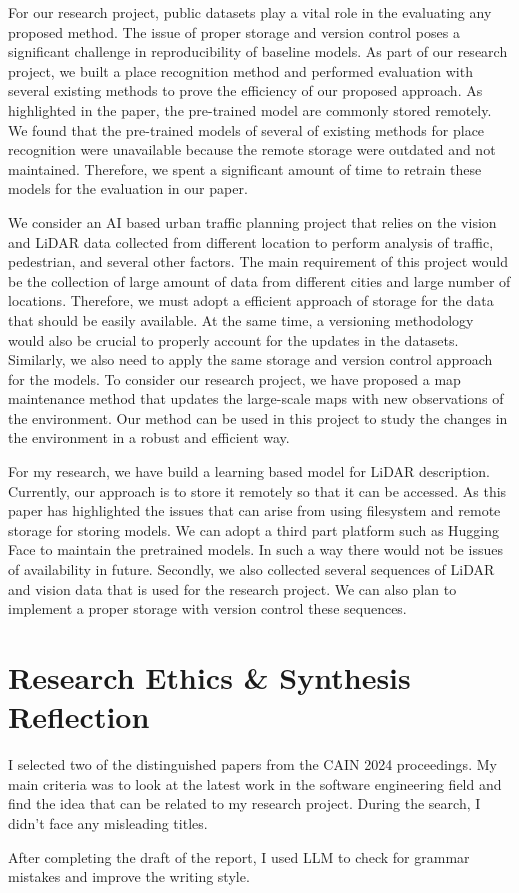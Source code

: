 \documentclass{article}
\begin{document}
For our research project, public datasets play a vital role in the evaluating any proposed method. The issue of proper storage and version control poses a significant challenge in reproducibility of baseline models. As part of our research project, we built a place recognition method and performed evaluation with several existing methods to prove the efficiency of our proposed approach. As highlighted in the paper, the pre-trained model are commonly stored remotely. We found that the pre-trained models of several of existing methods for place recognition were unavailable because the remote storage were outdated and not maintained. Therefore, we spent a significant amount of time to retrain these models for the evaluation in our paper.  

We consider an AI based urban traffic planning project that relies on the vision and LiDAR data collected from different location to perform analysis of traffic, pedestrian, and several other factors. The main requirement of this project would be the collection of large amount of data from different cities and large number of locations. Therefore, we must adopt a efficient approach of storage for the data that should be easily available. At the same time, a versioning methodology would also be crucial to properly account for the updates in the datasets. Similarly, we also need to apply the same storage and version control approach for the models. To consider our research project, we have proposed a map maintenance method that updates the large-scale maps with new observations of the environment. Our method can be used in this project to study the changes in the environment in a robust and efficient way.

For my research, we have build a learning based model for LiDAR description. Currently, our approach is to store it remotely so that it can be accessed. As this paper has highlighted the issues that can arise from using filesystem and remote storage for storing models. We can adopt a third part platform such as Hugging Face to maintain the pretrained models. In such a way there would not be issues of availability in future. Secondly, we also collected several sequences of LiDAR and vision data that is used for the research project. We can also plan to implement a proper storage with version control these sequences.


\section{Research Ethics \& Synthesis Reflection}

I selected two of the distinguished papers from the CAIN 2024 proceedings. My main criteria was to look at the latest work in the software engineering field and find the idea that can be related to my research project. During the search, I didn't face any misleading titles.

After completing the draft of the report, I used LLM to check for grammar mistakes and improve the writing style. 



\printbibliography
\end{document}
